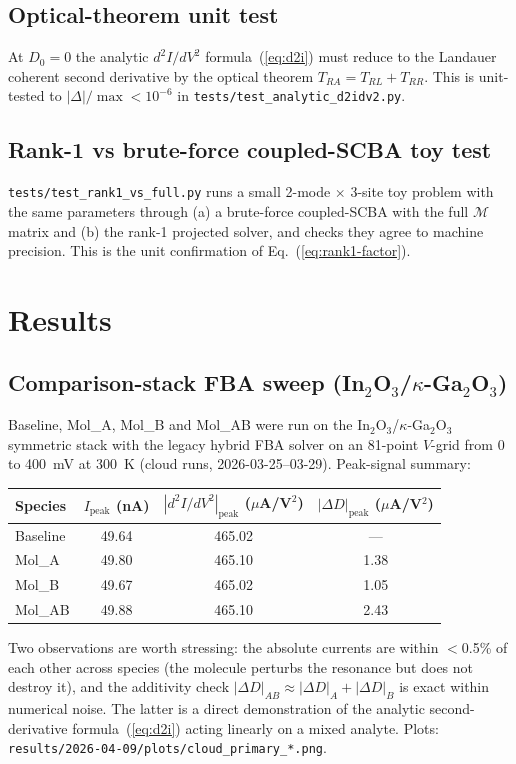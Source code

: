 \documentclass[11pt,a4paper,onecolumn]{article}
\newcommand{\code}[1]{\texttt{\small #1}}
\begin{document}
\subsection{Optical-theorem unit test}
At $D_0 = 0$ the analytic $d^2I/dV^2$ formula~(\ref{eq:d2i}) must reduce
to the Landauer coherent second derivative by the optical theorem
$T_{RA} = T_{RL} + T_{RR}$. This is unit-tested to
$|\Delta|/\max < 10^{-6}$ in \code{tests/test\_analytic\_d2idv2.py}.

\subsection{Rank-1 vs brute-force coupled-SCBA toy test}
\code{tests/test\_rank1\_vs\_full.py} runs a small 2-mode $\times$ 3-site
toy problem with the same parameters through (a) a brute-force coupled-SCBA
with the full $\mathcal M$ matrix and (b) the rank-1 projected solver, and
checks they agree to machine precision. This is the unit confirmation of
Eq.~(\ref{eq:rank1-factor}).

\section{Results}

\subsection{Comparison-stack FBA sweep (In\texorpdfstring{$_2$}{2}O\texorpdfstring{$_3$}{3}/\texorpdfstring{$\kappa$}{kappa}-Ga\texorpdfstring{$_2$}{2}O\texorpdfstring{$_3$}{3})}
\label{sec:results-comparison}
Baseline, Mol\_A, Mol\_B and Mol\_AB were run on the In$_2$O$_3$/$\kappa$-Ga$_2$O$_3$
symmetric stack with the legacy hybrid FBA solver on an 81-point
$V$-grid from 0 to 400~mV at 300~K (cloud runs, 2026-03-25--03-29).
Peak-signal summary:
\begin{center}
\small
\begin{tabular}{lccc}
\toprule
Species & $I_{\mathrm{peak}}$ (nA) & $|d^2I/dV^2|_{\mathrm{peak}}$ ($\mu$A/V$^2$) & $|\Delta D|_{\mathrm{peak}}$ ($\mu$A/V$^2$)\\
\midrule
Baseline & 49.64 & 465.02 & ---  \\
Mol\_A   & 49.80 & 465.10 & 1.38 \\
Mol\_B   & 49.67 & 465.02 & 1.05 \\
Mol\_AB  & 49.88 & 465.10 & 2.43 \\
\bottomrule
\end{tabular}
\end{center}
Two observations are worth stressing: the absolute currents are within
$<$0.5\% of each other across species (the molecule perturbs the
resonance but does not destroy it), and the additivity check
$|\Delta D|_{AB} \approx |\Delta D|_A + |\Delta D|_B$ is exact within
numerical noise. The latter is a direct demonstration of the analytic
second-derivative formula~(\ref{eq:d2i}) acting linearly on a mixed
analyte. Plots: \code{results/2026-04-09/plots/cloud\_primary\_*.png}.
\end{document}
